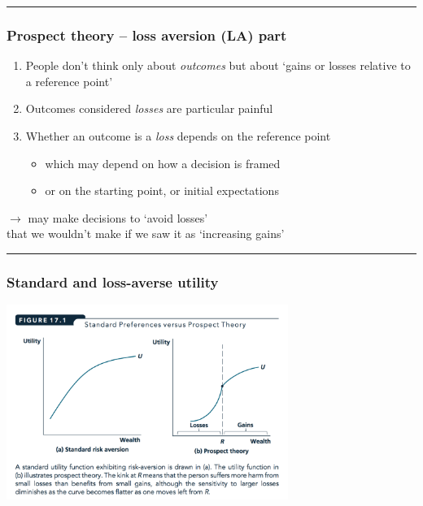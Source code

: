 \documentclass[]{article}
\providecommand{\tightlist}{%
  \setlength{\itemsep}{0pt}\setlength{\parskip}{0pt}}
\begin{document}
\begin{center}\rule{0.5\linewidth}{\linethickness}\end{center}

\hypertarget{prospect-theory-loss-aversion-la-part}{%
\subsubsection{Prospect theory -- loss aversion (LA)
part}\label{prospect-theory-loss-aversion-la-part}}

\begin{enumerate}
\def\labelenumi{\arabic{enumi}.}
\tightlist
\item
  People don't think only about \emph{outcomes} but about `gains or
  losses relative to a reference point'
\item
  Outcomes considered \emph{losses} are particular painful
\item
  Whether an outcome is a \emph{loss} depends on the reference point

  \begin{itemize}
  \tightlist
  \item
    which may depend on how a decision is framed
  \item
    or on the starting point, or initial expectations
  \end{itemize}
\end{enumerate}

\bigskip

\(\rightarrow\) may make decisions to `avoid losses'\\
that we wouldn't make if we saw it as `increasing gains'

\begin{center}\rule{0.5\linewidth}{\linethickness}\end{center}

\hypertarget{standard-and-loss-averse-utility}{%
\subsubsection{Standard and loss-averse
utility}\label{standard-and-loss-averse-utility}}

\includegraphics[height=2.5in]{picsfigs/std_u_prospect_u.png}
\end{document}
